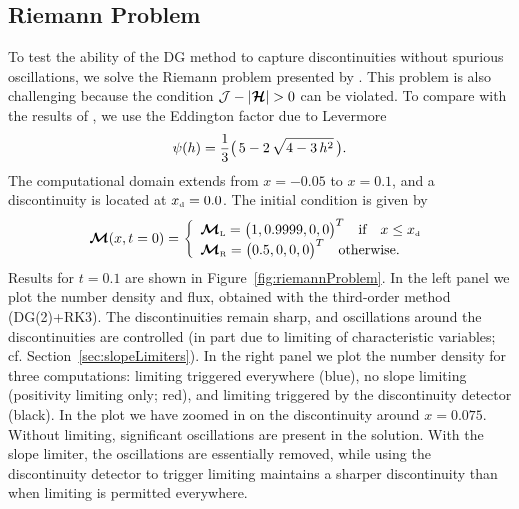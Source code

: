 \documentclass[10pt,preprint]{aastex}
\begin{document}
\subsection{Riemann Problem}

To test the ability of the DG method to capture discontinuities without spurious oscillations, we solve the Riemann problem presented by \citet{OHF2012}.  
This problem is also challenging because the condition $\cJ-|\bcH|>0$ can be violated.  
To compare with the results of \citet{OHF2012}, we use the Eddington factor due to Levermore \citep{levermore_1984}
\begin{equation}
  \psi(h)=\frac{1}{3}\big(\,5-2\,\sqrt{4-3\,h^{2}}\,\big).  
  \label{eq:eddingtonFactorLevermore}
\end{equation}
The computational domain extends from $x=-0.05$ to $x=0.1$, and a discontinuity is located at $x_{\mbox{\tiny d}}=0.0$.  
The initial condition is given by
\begin{equation}
  \boldsymbol{\mathcal{M}}(x,t=0)=
  \left\{
  \begin{array}{l}
  \boldsymbol{\mathcal{M}}_{\mbox{\tiny L}}=\big(1,0.9999,0,0\big)^{T} \quad\text{if}\quad x\le x_{\mbox{\tiny d}} \\
  \boldsymbol{\mathcal{M}}_{\mbox{\tiny R}}=\big(0.5,0,0,0\big)^{T} \quad\text{otherwise}.
  \end{array}
  \right.
  \label{eq:riemannProblem}
\end{equation}
Results for $t=0.1$ are shown in Figure~\ref{fig:riemannProblem}.  
In the left panel we plot the number density and flux, obtained with the third-order method (DG(2)+RK3).  
The discontinuities remain sharp, and oscillations around the discontinuities are controlled (in part due to limiting of characteristic variables; cf. Section~\ref{sec:slopeLimiters}).  
In the right panel we plot the number density for three computations: limiting triggered everywhere (blue), no slope limiting (positivity limiting only; red), and limiting triggered by the discontinuity detector (black).  
In the plot we have zoomed in on the discontinuity around $x=0.075$.  
Without limiting, significant oscillations are present in the solution.  
With the slope limiter, the oscillations are essentially removed, while using the discontinuity detector to trigger limiting maintains a sharper discontinuity than when limiting is permitted everywhere.  
\end{document}
